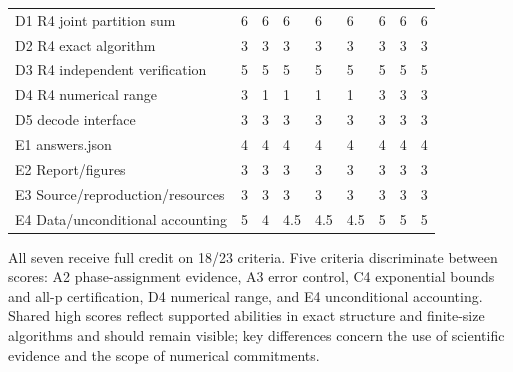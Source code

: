 \documentclass[11pt,a4paper]{article}
\begin{document}
{\begin{longtable}
{}D1 R4 joint partition sum & 6 & 6 & 6 & 6 & 6 & 6 & 6 & 6\tabularnewline
{}D2 R4 exact algorithm & 3 & 3 & 3 & 3 & 3 & 3 & 3 & 3\tabularnewline
{}D3 R4 independent verification & 5 & 5 & 5 & 5 & 5 & 5 & 5 & 5\tabularnewline
{}D4 R4 numerical range & 3 & 1 & 1 & 1 & 1 & 3 & 3 & 3\tabularnewline
{}D5 decode interface & 3 & 3 & 3 & 3 & 3 & 3 & 3 & 3\tabularnewline
{}E1 answers.json & 4 & 4 & 4 & 4 & 4 & 4 & 4 & 4\tabularnewline
{}E2 Report/\allowbreak{}figures & 3 & 3 & 3 & 3 & 3 & 3 & 3 & 3\tabularnewline
{}E3 Source/\allowbreak{}reproduction/\allowbreak{}resources & 3 & 3 & 3 & 3 & 3 & 3 & 3 & 3\tabularnewline
{}E4 Data/\allowbreak{}unconditional accounting & 5 & 4 & 4.5 & 4.5 & 4.5 & 5 & 5 & 5\tabularnewline
\bottomrule
\end{longtable}
}
All seven receive full credit on 18/\allowbreak{}23 criteria. Five criteria discriminate between scores: A2 phase-assignment evidence,\allowbreak{} A3 error control,\allowbreak{} C4 exponential bounds and all-p certification,\allowbreak{} D4 numerical range,\allowbreak{} and E4 unconditional accounting. Shared high scores reflect supported abilities in exact structure and finite-size algorithms and should remain visible; key differences concern the use of scientific evidence and the scope of numerical commitments.

\clearpage
\end{document}
